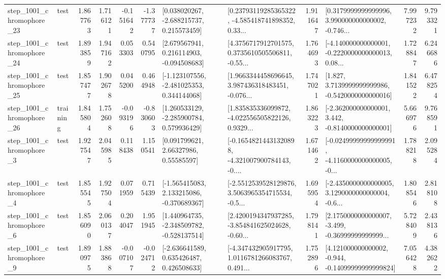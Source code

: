 \begin{tabular}{llrrrrllrlrr}
 step\_1001\_chromophore\_23 &      test &      1.867763 &    1.716121 &     -0.151642 & -1.377737 &    [0.038020267, -2.688215737, 0.215573459] &  [0.23793119285365322, -4.585418741898352, 0.33... &       1.911647 &  [0.3179999999999996, 3.990000000000002, -0.746... &            7.997232 &          9.793321 \\
 step\_1001\_chromophore\_24 &      test &      1.893859 &    1.947162 &      0.053303 &  0.540795 &    [2.679567941, 0.216114903, -0.094508683] &  [4.3756717912701575, 0.3735610505506811, -0.55... &       1.764693 &  [-4.140000000000001, -0.2220000000000013, 0.08... &            1.728847 &          6.246686 \\
 step\_1001\_chromophore\_25 &      test &      1.857477 &    1.902678 &      0.045200 &  0.464948 &   [-1.123107556, -2.481025353, 0.344144068] &  [1.9663344458696645, 3.987436318483451, -0.076... &       1.747021 &   [1.827, 3.7139999999999986, -0.5420000000000016] &            1.841522 &          6.478254 \\
 step\_1001\_chromophore\_26 &  training &      1.845804 &    1.752608 &     -0.093196 & -0.830603 &    [1.260533129, -2.285900784, 0.579936429] &  [1.835835336099872, -4.022556505822126, 0.9329... &       1.863223 &   [-2.362000000000001, 3.442, -0.8140000000000001] &            5.666976 &          9.768591 \\
  step\_1001\_chromophore\_3 &      test &      1.927547 &    2.045985 &      0.118438 &  1.150541 &       [0.091799621, 2.66327986, 0.55585597] &  [-0.16548214431320898, -4.321007900784143, -0.... &       1.671462 &  [-0.02499999999999991, -4.1160000000000005, -0... &            1.788218 &          2.095284 \\
  step\_1001\_chromophore\_4 &      test &      1.855545 &    1.927504 &      0.071959 &  0.715439 &   [-1.565415083, 2.133215086, -0.370689367] &  [-2.5512539528129876, 3.5063965354715534, -0.5... &       1.695954 &  [-2.4350000000000005, 3.1290000000000004, -0.6... &            1.808546 &          2.818108 \\
  step\_1001\_chromophore\_6 &      test &      1.856090 &    2.060137 &      0.204047 &  1.951945 &   [1.440964735, -2.348509782, -0.528137514] &  [2.4200194347937285, -3.854841625024628, -0.60... &       1.798141 &  [2.1750000000000007, -3.499, -0.36999999999999... &            5.728409 &          2.438136 \\
  step\_1001\_chromophore\_9 &      test &      1.890975 &    1.883868 &     -0.007107 & -0.024712 &    [-2.636641589, 0.635426487, 0.426508633] &  [-4.347432905917795, 1.0116781266083767, 0.491... &       1.752896 &  [4.121000000000002, -0.944, -0.14099999999999824] &            7.056428 &          4.382622 \\

\end{tabular}
